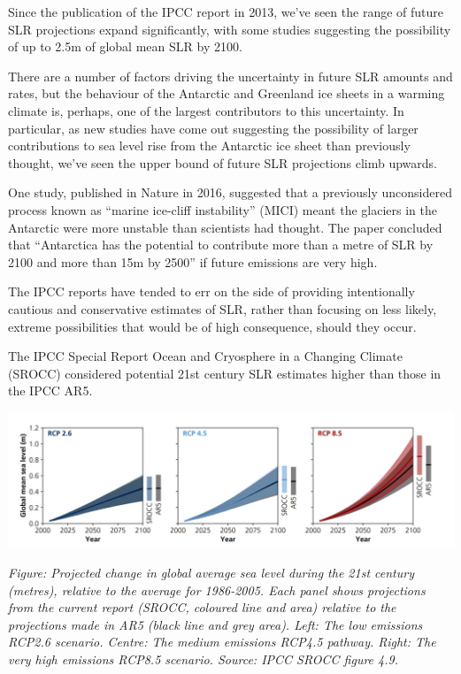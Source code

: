 \documentclass[
]{book}
\begin{document}
Since the publication of the IPCC report in 2013, we've seen the range of future SLR projections expand significantly, with some studies suggesting the possibility of up to 2.5m of global mean SLR by 2100.

There are a number of factors driving the uncertainty in future SLR amounts and rates, but the behaviour of the Antarctic and Greenland ice sheets in a warming climate is, perhaps, one of the largest contributors to this uncertainty. In particular, as new studies have come out suggesting the possibility of larger contributions to sea level rise from the Antarctic ice sheet than previously thought, we've seen the upper bound of future SLR projections climb upwards.

One study, published in Nature in 2016, suggested that a previously unconsidered process known as ``marine ice-cliff instability'' (MICI) meant the glaciers in the Antarctic were more unstable than scientists had thought. The paper concluded that ``Antarctica has the potential to contribute more than a metre of SLR by 2100 and more than 15m by 2500'' if future emissions are very high.

The IPCC reports have tended to err on the side of providing intentionally cautious and conservative estimates of SLR, rather than focusing on less likely, extreme possibilities that would be of high consequence, should they occur.

The IPCC Special Report Ocean and Cryosphere in a Changing Climate (SROCC) considered potential 21st century SLR estimates higher than those in the IPCC AR5.

\includegraphics{fig/sea_level_srocc.jpg}

\emph{Figure: Projected change in global average sea level during the 21st century (metres), relative to the average for 1986-2005. Each panel shows projections from the current report (SROCC, coloured line and area) relative to the projections made in AR5 (black line and grey area). Left: The low emissions RCP2.6 scenario. Centre: The medium emissions RCP4.5 pathway. Right: The very high emissions RCP8.5 scenario. Source: IPCC SROCC figure 4.9.}
\end{document}

